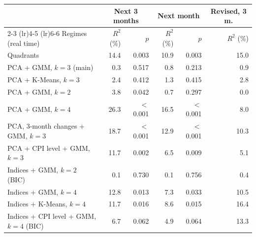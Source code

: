 \begin{tabular}{lrrrrr}
\toprule
 & \multicolumn{2}{c}{Next 3 months} & \multicolumn{2}{c}{Next month} & \multicolumn{1}{c}{Revised, 3 m.} \\
\cmidrule(lr){2-3} \cmidrule(lr){4-5} \cmidrule(lr){6-6}
Regimes (real time) & $R^2$ (\%) & $p$ & $R^2$ (\%) & $p$ & $R^2$ (\%) \\
\midrule
Quadrants & 14.4 & 0.003 & 10.9 & 0.003 & 15.0 \\
PCA + GMM, $k=3$ (main) & 0.3 & 0.517 & 0.8 & 0.213 & 0.9 \\
PCA + K-Means, $k=3$ & 2.4 & 0.412 & 1.3 & 0.415 & 2.8 \\
PCA + GMM, $k=2$ & 3.8 & 0.042 & 0.7 & 0.297 & 0.0 \\
PCA + GMM, $k=4$ & 26.3 & $<$0.001 & 16.5 & $<$0.001 & 8.0 \\
PCA, 3-month changes + GMM, $k=3$ & 18.7 & $<$0.001 & 12.9 & $<$0.001 & 10.3 \\
PCA + CPI level + GMM, $k=3$ & 11.7 & 0.002 & 6.5 & 0.009 & 5.1 \\
Indices + GMM, $k=2$ (BIC) & 0.1 & 0.730 & 0.1 & 0.756 & 0.4 \\
Indices + GMM, $k=4$ & 12.8 & 0.013 & 7.3 & 0.033 & 10.5 \\
Indices + K-Means, $k=4$ & 11.7 & 0.016 & 8.6 & 0.015 & 16.4 \\
Indices + CPI level + GMM, $k=4$ (BIC) & 6.7 & 0.062 & 4.9 & 0.064 & 13.3 \\
\bottomrule
\end{tabular}
